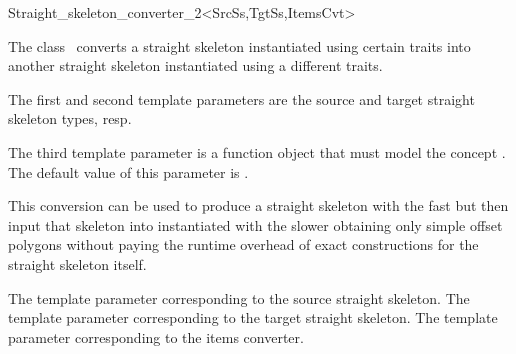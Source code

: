 

\begin{ccRefClass}{Straight_skeleton_converter_2<SrcSs,TgtSs,ItemsCvt>}


\ccDefinition

The class \ccRefName\ converts a straight skeleton instantiated using certain traits into another straight skeleton instantiated using a different traits.

The first and second template parameters are the source and target straight skeleton types, resp.

The third template parameter  is a function object that must
model the concept . The default value of this parameter is .

This conversion can be used to produce a straight skeleton with the fast
 but then input that skeleton
into  instantiated with the slower  obtaining only simple offset
polygons without paying the runtime overhead of exact constructions for the straight 
skeleton itself.

\ccTypes
{}
  {The  template parameter corresponding to the source straight skeleton.}
\ccGlue
{}
  {The  template parameter corresponding to the target straight skeleton.}
\ccGlue
{}
  {The  template parameter corresponding to the items converter.}


\end{ccRefClass}
